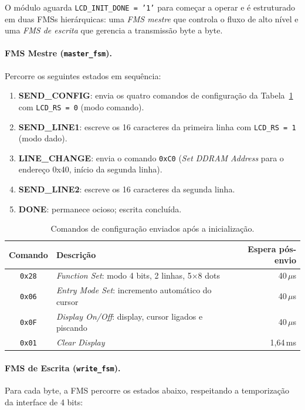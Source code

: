 \documentclass[12pt,a4paper]{article}
\begin{document}
O módulo aguarda \texttt{LCD\_INIT\_DONE = '1'} para começar a operar e é estruturado
em duas FMSs hierárquicas: uma \textit{FMS mestre} que controla o fluxo de alto nível e
uma \textit{FMS de escrita} que gerencia a transmissão byte a byte.

\paragraph{FMS Mestre (\texttt{master\_fsm}).}
Percorre os seguintes estados em sequência:

\begin{enumerate}
    \item \textbf{SEND\_CONFIG}: envia os quatro comandos de configuração da
          Tabela~\ref{tab:config_cmds} com \texttt{LCD\_RS = 0} (modo comando).
    \item \textbf{SEND\_LINE1}: escreve os 16 caracteres da primeira linha com
          \texttt{LCD\_RS = 1} (modo dado).
    \item \textbf{LINE\_CHANGE}: envia o comando \texttt{0xC0}
          (\textit{Set DDRAM Address} para o endereço 0x40, início da segunda linha).
    \item \textbf{SEND\_LINE2}: escreve os 16 caracteres da segunda linha.
    \item \textbf{DONE}: permanece ocioso; escrita concluída.
\end{enumerate}

\begin{table}[H]
\centering
\begin{tabular}{clr}
\hline
\textbf{Comando} & \textbf{Descrição} & \textbf{Espera pós-envio} \\
\hline
\texttt{0x28} & \textit{Function Set}: modo 4 bits, 2 linhas, 5$\times$8 dots & 40\,$\mu$s \\
\texttt{0x06} & \textit{Entry Mode Set}: incremento automático do cursor       & 40\,$\mu$s \\
\texttt{0x0F} & \textit{Display On/Off}: display, cursor ligados e piscando    & 40\,$\mu$s \\
\texttt{0x01} & \textit{Clear Display}                                          & 1{,}64\,ms \\
\hline
\end{tabular}
\caption{Comandos de configuração enviados após a inicialização.}
\label{tab:config_cmds}
\end{table}

\paragraph{FMS de Escrita (\texttt{write\_fsm}).}
Para cada byte, a FMS percorre os estados abaixo, respeitando a temporização da
interface de 4 bits:
\end{document}
